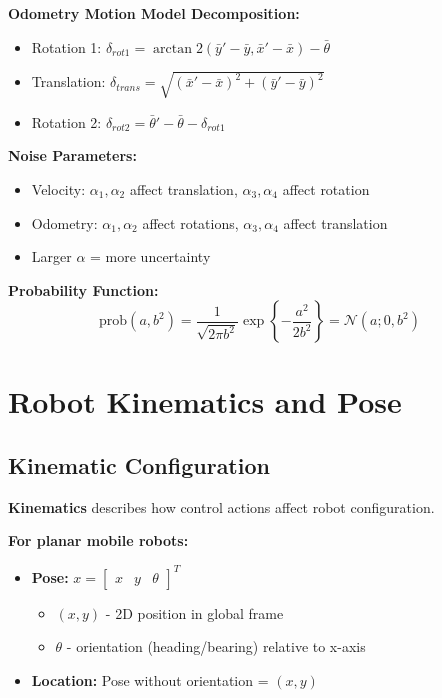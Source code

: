\begin{tcolorbox}[colback=yellow!10!white,colframe=orange!75!black,title=\textbf{Robot Motion Models - Fast Reference}]
\vspace{3mm}
\textbf{Odometry Motion Model Decomposition:}
\begin{itemize}
    \item Rotation 1: $\delta_{rot1} = \arctan2(\bar{y}' - \bar{y}, \bar{x}' - \bar{x}) - \bar{\theta}$
    \item Translation: $\delta_{trans} = \sqrt{(\bar{x}' - \bar{x})^2 + (\bar{y}' - \bar{y})^2}$
    \item Rotation 2: $\delta_{rot2} = \bar{\theta}' - \bar{\theta} - \delta_{rot1}$
\end{itemize}

\vspace{3mm}
\textbf{Noise Parameters:}
\begin{itemize}
    \item Velocity: $\alpha_1, \alpha_2$ affect translation, $\alpha_3, \alpha_4$ affect rotation
    \item Odometry: $\alpha_1, \alpha_2$ affect rotations, $\alpha_3, \alpha_4$ affect translation
    \item Larger $\alpha$ = more uncertainty
\end{itemize}

\vspace{3mm}
\textbf{Probability Function:}
$$\text{prob}(a, b^2) = \frac{1}{\sqrt{2\pi b^2}} \exp\left\{-\frac{a^2}{2b^2}\right\} = \mathcal{N}(a; 0, b^2)$$

\end{tcolorbox}

\section{Robot Kinematics and Pose}

\subsection{Kinematic Configuration}

\textbf{Kinematics} describes how control actions affect robot configuration.

\textbf{For planar mobile robots:}
\begin{itemize}
    \item \textbf{Pose:} $x = \begin{bmatrix} x & y & \theta \end{bmatrix}^T$
    \begin{itemize}
        \item $(x, y)$ - 2D position in global frame
        \item $\theta$ - orientation (heading/bearing) relative to x-axis
    \end{itemize}
    \item \textbf{Location:} Pose without orientation = $(x, y)$
\end{itemize}

